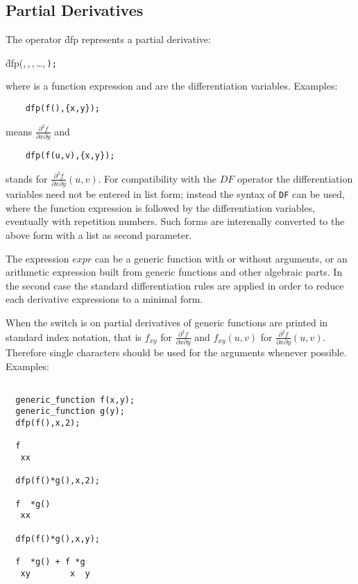 \subsection{Partial Derivatives}

\hypertarget{operator:DFP}{}
The operator \f{dfp} represents a partial derivative:
\begin{syntax}
  \f{dfp(},\,,\,,\,\dots,\,\texttt{);}
\end{syntax}
\noindent
where  is a function expression and  are
the differentiation variables. Examples:

\begin{verbatim}
    dfp(f(),{x,y});
\end{verbatim}
means $\displaystyle\frac{\partial ^2 f}{\partial x \partial y}$ and
\begin{verbatim}
    dfp(f(u,v),{x,y});
\end{verbatim}
stands for $\displaystyle\frac{\partial ^2 f}{\partial x \partial y} (u,v)$.
For compatibility with the $DF$ operator the differentiation
variables need not be entered in list form; instead the syntax
of \texttt{DF} can be used, where the function expression is followed
by the differentiation variables, eventually with repetition
numbers. Such forms are interenally converted to the above
form with a list as second parameter.

The expression $expr$ can be a generic function
with or without arguments, or an arithmetic expression built
from generic functions and other algebraic parts. In the
second case the standard differentiation rules are applied
in order to reduce each derivative expressions to a minimal
form.

When the switch  is on partial derivatives of generic
functions are printed in standard index notation, that is
$f_{xy}$ for $\displaystyle\frac{\partial ^2 f}{\partial x \partial y}$
and $f_{xy}(u,v)$ for $\displaystyle\frac{\partial ^2 f}{\partial x \partial y}(u,v)$.
Therefore single characters should be used for the arguments
whenever possible. Examples:

\begin{verbatim}

  generic_function f(x,y);
  generic_function g(y);
  dfp(f(),x,2);

  f
   xx

  dfp(f()*g(),x,2);

  f  *g()
   xx

  dfp(f()*g(),x,y);

  f  *g() + f *g
   xy        x  y

\end{verbatim}

